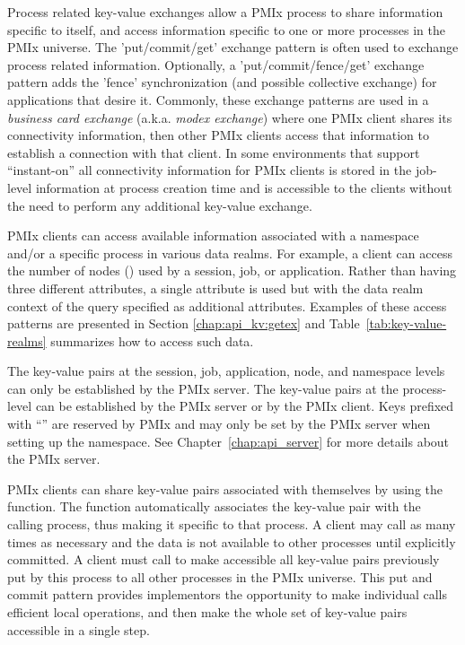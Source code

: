 Process related key-value exchanges allow a \ac{PMIx} process to share information specific to itself, and access information specific to one or more processes in the \ac{PMIx} universe.
The 'put/commit/get' exchange pattern is often used to exchange process related information.
Optionally, a 'put/commit/fence/get' exchange pattern adds the 'fence' synchronization (and possible collective exchange) for applications that desire it.
Commonly, these exchange patterns are used in a \emph{business card exchange} (a.k.a. \emph{modex exchange}) where one \ac{PMIx} client shares its connectivity information, then other \ac{PMIx} clients access that information to establish a connection with that client.
In some environments that support ``instant-on'' all connectivity information for \ac{PMIx} clients is stored in the job-level information at process creation time and is accessible to the clients without the need to perform any additional key-value exchange.

\ac{PMIx} clients can access available information associated with a namespace and/or a specific process in various data realms.
For example, a client can access the number of nodes () used by a session, job, or application.
Rather than having three different attributes, a single attribute is used but with the data realm context of the query specified as additional attributes.
Examples of these access patterns are presented in Section \ref{chap:api_kv:getex} and Table~\ref{tab:key-value-realms} summarizes how to access such data.

The key-value pairs at the session, job, application, node, and namespace levels can only be established by the \ac{PMIx} server.
The key-value pairs at the process-level can be established by the \ac{PMIx} server or by the \ac{PMIx} client.
Keys prefixed with ``'' are reserved by \ac{PMIx} and may only be set by the \ac{PMIx} server when setting up the namespace.
See Chapter~\ref{chap:api_server} for more details about the \ac{PMIx} server.

\ac{PMIx} clients can share key-value pairs associated with themselves by using the  function.
The  function automatically associates the key-value pair with the calling process, thus making it specific to that process.
A client may call  as many times as necessary and the data is not available to other processes until explicitly committed.
A client must call  to make accessible all key-value pairs previously put by this process to all other processes in the \ac{PMIx} universe.
This put and commit pattern provides implementors the opportunity to make individual  calls efficient local operations, and then make the whole set of key-value pairs accessible in a single step.

